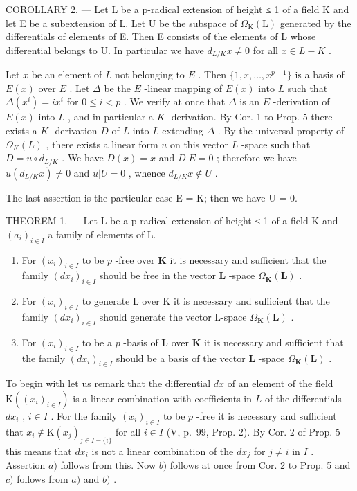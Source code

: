 COROLLARY 2. --- Let L be a p-radical extension of height ≤ 1 of a field K and let E be a subextension of L. Let U be the subspace of \(\Omega_{\mathrm{K}}(\mathrm{L})\) generated by the differentials of elements of E. Then E consists of the elements of L whose differential belongs to U. In particular we have \(d_{L/K}x \neq 0\) for all \(x \in L - K\) .

Let \(x\) be an element of \(L\) not belonging to \(E\) . Then \(\{1, x, \ldots, x^{p-1}\}\) is a basis of \(E(x)\) over \(E\) . Let \(\Delta\) be the \(E\) -linear mapping of \(E(x)\) into \(L\) such that \(\Delta(x^i) = ix^i\) for \(0 \leqslant i < p\) . We verify at once that \(\Delta\) is an \(E\) -derivation of \(E(x)\) into \(L\) , and in particular a \(K\) -derivation. By Cor. 1 to Prop. 5 there exists a \(K\) -derivation \(D\) of \(L\) into \(L\) extending \(\Delta\) . By the universal property of \(\Omega_K(L)\) , there exists a linear form \(u\) on this vector \(L\) -space such that \(D = u \circ d_{L/K}\) . We have \(D(x) = x\) and \(D|E = 0\) ; therefore we have \(u(d_{L/K}x) \neq 0\) and \(u|U = 0\) , whence \(d_{L/K}x \notin U\) .

The last assertion is the particular case E = K; then we have U = 0.

THEOREM 1. --- Let L be a p-radical extension of height ≤ 1 of a field K and \((a_{i})_{i \in I}\) a family of elements of L.

\begin{enumerate}
\def\labelenumi{\alph{enumi})}
\item
  For \((x_{i})_{i\in I}\) to be \(p\) -free over \(\mathbf{K}\) it is necessary and sufficient that the family \((dx_{i})_{i\in I}\) should be free in the vector \(\mathbf{L}\) -space \(\Omega_{\mathbf{K}}(\mathbf{L})\) .
\item
  For \((x_{i})_{i\in I}\) to generate L over K it is necessary and sufficient that the family \((dx_{i})_{i\in I}\) should generate the vector L-space \(\Omega_{\mathbf{K}}(\mathbf{L})\) .
\item
  For \((x_{i})_{i\in I}\) to be a \(p\) -basis of \(\mathbf{L}\) over \(\mathbf{K}\) it is necessary and sufficient that the family \((dx_{i})_{i\in I}\) should be a basis of the vector \(\mathbf{L}\) -space \(\Omega_{\mathbf{K}}(\mathbf{L})\) .
\end{enumerate}

To begin with let us remark that the differential \(dx\) of an element of the field \(\mathrm{K}((x_i)_{i \in I})\) is a linear combination with coefficients in \(L\) of the differentials \(dx_i\) , \(i \in I\) . For the family \((x_i)_{i \in I}\) to be \(p\) -free it is necessary and sufficient that \(x_i \notin \mathrm{K}(x_j)_{j \in I - \{i\}}\) for all \(i \in I\) (V, p.~99, Prop. 2). By Cor. 2 of Prop. 5 this means that \(dx_i\) is not a linear combination of the \(dx_j\) for \(j \neq i\) in \(I\) . Assertion \(a)\) follows from this. Now \(b)\) follows at once from Cor. 2 to Prop. 5 and \(c)\) follows from \(a)\) and \(b)\) .

